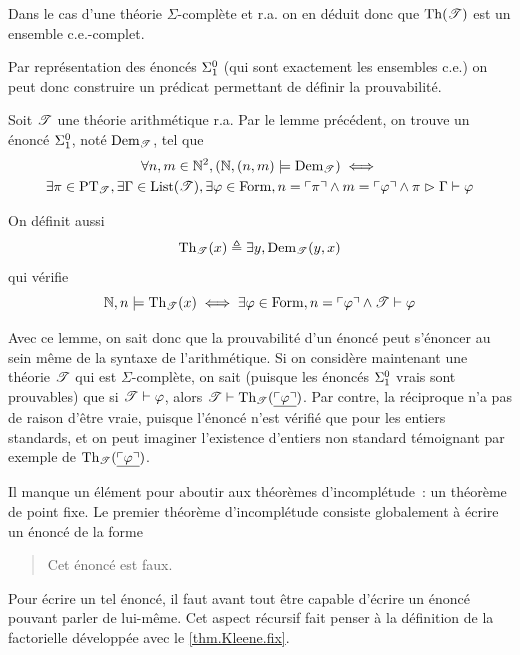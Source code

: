 \begin{remark}
  Dans le cas d'une théorie $\Sigma$-complète et r.a. on en déduit donc que
  $\operatorname{Th}(\mathscr T)$ est un ensemble c.e.-complet.
\end{remark}

Par représentation des énoncés $\Sigma^0_{1}$ (qui sont exactement les
ensembles c.e.) on peut donc construire un prédicat permettant de définir la
prouvabilité.

\begin{definition}
  Soit $\mathscr T$ une théorie arithmétique r.a. Par le lemme précédent, on trouve
  un énoncé $\Sigma^0_{1}$, noté $\operatorname{Dem}_{\mathscr T}$, tel que
  \begin{multline*}
  \forall n,m \in \mathbb N^2, (\mathbb N,(n,m) \models \operatorname{Dem}_{\mathscr T}) \iff\\
  \exists \pi \in \operatorname{PT}_{\mathscr T}, \exists \Gamma \in \operatorname{List}(\mathscr T),
  \exists \varphi \in \operatorname{Form},
  n = \ulcorner\pi\urcorner \land m = \ulcorner\varphi\urcorner \land
  \pi \mathrel{\rhd} \Gamma\vdash \varphi
  \end{multline*}

  On définit aussi
  \[\operatorname{Th}_{\mathscr T}(x) \triangleq \exists y, \operatorname{Dem}_{\mathscr T}(y,x)\]
  qui vérifie
  \[\mathbb N,n\models \operatorname{Th}_{\mathscr T}(x) \iff \exists \varphi \in \operatorname{Form},
  n = \ulcorner\varphi\urcorner \land \mathscr T \vdash \varphi\]
\end{definition}

Avec ce lemme, on sait donc que la prouvabilité d'un énoncé peut s'énoncer au
sein même de la syntaxe de l'arithmétique. Si on considère maintenant une
théorie $\mathscr T$ qui est $\Sigma$-complète, on sait (puisque les énoncés
$\Sigma^0_{1}$ vrais sont prouvables) que si $\mathscr T \vdash \varphi$, alors
$\mathscr T \vdash \operatorname{Th}_{\mathscr T}(\underline{\ulcorner\varphi\urcorner})$. Par
contre, la réciproque n'a pas de raison d'être vraie, puisque l'énoncé n'est
vérifié que pour les entiers standards, et on peut imaginer l'existence
d'entiers non standard témoignant par exemple de
$\operatorname{Th}_{\mathscr T}(\underline{\ulcorner\varphi\urcorner})$.

Il manque un élément pour aboutir aux théorèmes d'incomplétude~: un théorème de
point fixe. Le premier théorème d'incomplétude consiste globalement à écrire un
énoncé de la forme
\begin{quotation}
  \noindent
  Cet énoncé est faux.
\end{quotation}

Pour écrire un tel énoncé, il faut avant tout être capable d'écrire un énoncé
pouvant parler de lui-même. Cet aspect récursif fait penser à la définition de
la factorielle développée avec le \cref{thm.Kleene.fix}.

